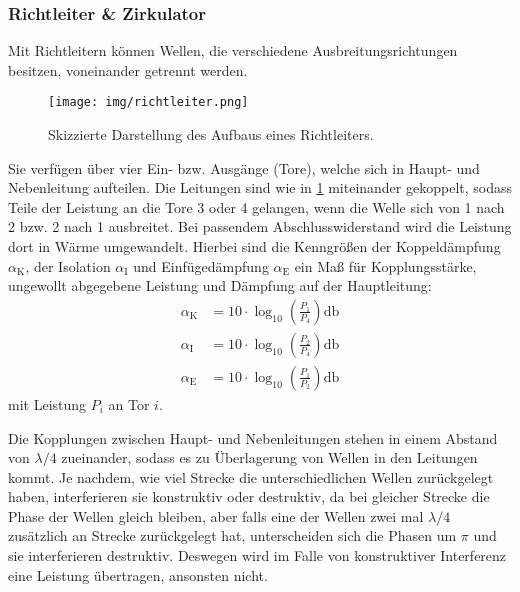 \subsubsection*{Richtleiter \& Zirkulator}
	
	Mit Richtleitern können Wellen, die verschiedene Ausbreitungsrichtungen besitzen, voneinander getrennt werden.
	\begin{figure}[h]
		\centering
		\texttt{[image: img/richtleiter.png]}
		\caption{Skizzierte Darstellung des Aufbaus eines Richtleiters.\cite{wwu}}
		\label{fig:richtleiter}
	\end{figure}
	Sie verfügen über vier Ein- bzw. Ausgänge (Tore), welche sich in Haupt- und Nebenleitung aufteilen.
	Die Leitungen sind wie in \cref{fig:richtleiter} miteinander gekoppelt, sodass Teile der Leistung an die Tore 3 oder 4 gelangen, wenn die Welle sich von 1 nach 2 bzw. 2 nach 1 ausbreitet.
	Bei passendem Abschlusswiderstand wird die Leistung dort in Wärme umgewandelt.
	Hierbei sind die Kenngrößen der Koppeldämpfung $\alpha_\text{K}$, der Isolation $\alpha_\text{I}$ und Einfügedämpfung $\alpha_\text{E}$ ein Maß für Kopplungsstärke, ungewollt abgegebene Leistung und Dämpfung auf der Hauptleitung:
	\begin{align}
		\alpha_\text{K} &=  10 \cdot \log_{10}\left(\frac{P_1}{P_4}\right)\si{\decibel} \\
		\alpha_\text{I} &=  10 \cdot \log_{10}\left(\frac{P_2}{P_4}\right)\si{\decibel} \\
		\alpha_\text{E} &=  10 \cdot \log_{10}\left(\frac{P_1}{P_2}\right)\si{\decibel}
	\end{align}
	mit Leistung $P_i$ an Tor $i$.
	
	Die Kopplungen zwischen Haupt- und Nebenleitungen stehen in einem Abstand von $\lambda/4$ zueinander, sodass es zu Überlagerung von Wellen in den Leitungen kommt.
	Je nachdem, wie viel Strecke die unterschiedlichen Wellen zurückgelegt haben, interferieren sie konstruktiv oder destruktiv, da bei gleicher Strecke die Phase der Wellen gleich bleiben, aber falls eine der Wellen zwei mal $\lambda/4$ zusätzlich an Strecke zurückgelegt hat, unterscheiden sich die Phasen um $\pi$ und sie interferieren destruktiv.
	Deswegen wird im Falle von konstruktiver Interferenz eine Leistung übertragen, ansonsten nicht.
	
	\
	

